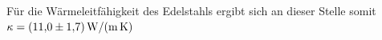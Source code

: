 Für die Wärmeleitfähigkeit des Edelstahls ergibt sich an dieser Stelle somit $\kappa = \SI{11.0 \pm 1.7}{\watt\per\meter\per\kelvin}$
